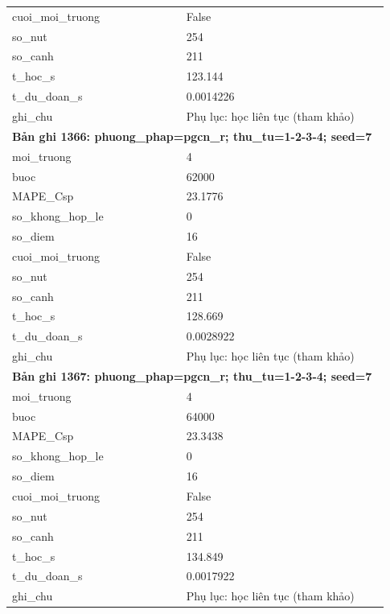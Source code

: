 \begin{longtable}{p{0.43\linewidth}p{0.50\linewidth}}
cuoi\_\allowbreak moi\_\allowbreak truong & False \\
so\_\allowbreak nut & 254 \\
so\_\allowbreak canh & 211 \\
t\_\allowbreak hoc\_\allowbreak s & 123.144 \\
t\_\allowbreak du\_\allowbreak doan\_\allowbreak s & 0.0014226 \\
ghi\_\allowbreak chu & Phụ lục: học liên tục (tham khảo) \\
\midrule
\multicolumn{2}{p{0.95\linewidth}}{\textbf{Bản ghi 1366: phuong\_phap=pgcn\_r; thu\_tu=1-2-3-4; seed=7}} \\
moi\_\allowbreak truong & 4 \\
buoc & 62000 \\
MAPE\_\allowbreak Csp & 23.1776 \\
so\_\allowbreak khong\_\allowbreak hop\_\allowbreak le & 0 \\
so\_\allowbreak diem & 16 \\
cuoi\_\allowbreak moi\_\allowbreak truong & False \\
so\_\allowbreak nut & 254 \\
so\_\allowbreak canh & 211 \\
t\_\allowbreak hoc\_\allowbreak s & 128.669 \\
t\_\allowbreak du\_\allowbreak doan\_\allowbreak s & 0.0028922 \\
ghi\_\allowbreak chu & Phụ lục: học liên tục (tham khảo) \\
\midrule
\multicolumn{2}{p{0.95\linewidth}}{\textbf{Bản ghi 1367: phuong\_phap=pgcn\_r; thu\_tu=1-2-3-4; seed=7}} \\
moi\_\allowbreak truong & 4 \\
buoc & 64000 \\
MAPE\_\allowbreak Csp & 23.3438 \\
so\_\allowbreak khong\_\allowbreak hop\_\allowbreak le & 0 \\
so\_\allowbreak diem & 16 \\
cuoi\_\allowbreak moi\_\allowbreak truong & False \\
so\_\allowbreak nut & 254 \\
so\_\allowbreak canh & 211 \\
t\_\allowbreak hoc\_\allowbreak s & 134.849 \\
t\_\allowbreak du\_\allowbreak doan\_\allowbreak s & 0.0017922 \\
ghi\_\allowbreak chu & Phụ lục: học liên tục (tham khảo) \\

\end{longtable}
